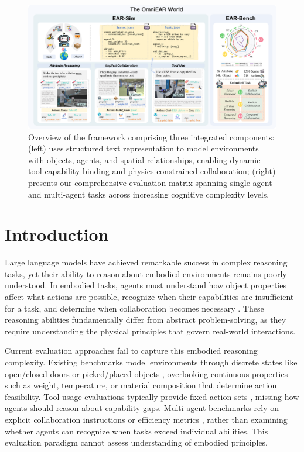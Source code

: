 \begin{figure}
    \centering
    \includegraphics[width=1\linewidth]{figures/main.pdf}   \caption{Overview of the \framework framework comprising three integrated components: \textbf{\simulator} (left) uses structured text representation to model environments with objects, agents, and spatial relationships, enabling dynamic tool-capability binding and physics-constrained collaboration; \textbf{\benchmark} (right) presents our comprehensive evaluation matrix spanning single-agent and multi-agent tasks across increasing cognitive complexity levels.}
 
    \label{fig:main-overview}
\end{figure}
\section{Introduction}
Large language models have achieved remarkable success in complex reasoning tasks\citep{brown2020language,wei2022chain}, yet their ability to reason about embodied environments remains poorly understood. In embodied tasks, agents must understand how object properties affect what actions are possible, recognize when their capabilities are insufficient for a task, and determine when collaboration becomes necessary \citep{ahn2022icanisay, wu2023embodiedtaskplanninglarge}. These reasoning abilities fundamentally differ from abstract problem-solving, as they require understanding the physical principles that govern real-world interactions.

Current evaluation approaches fail to capture this embodied reasoning complexity. Existing benchmarks model environments through discrete states like open/closed doors or picked/placed objects \citep{shridhar2020alfredbenchmarkinterpretinggrounded, puig2018virtualhomesimulatinghouseholdactivities}, overlooking continuous properties such as weight, temperature, or material composition that determine action feasibility. Tool usage evaluations typically provide fixed action sets \citep{chang2024partnrbenchmarkplanningreasoning,huang2022inner}, missing how agents should reason about capability gaps. Multi-agent benchmarks rely on explicit collaboration instructions or efficiency metrics \citep{kang2025vikircoordinatingembodiedmultiagent, zhang2024buildingcooperativeembodiedagents}, rather than examining whether agents can recognize when tasks exceed individual abilities. This evaluation paradigm cannot assess understanding of embodied principles.


